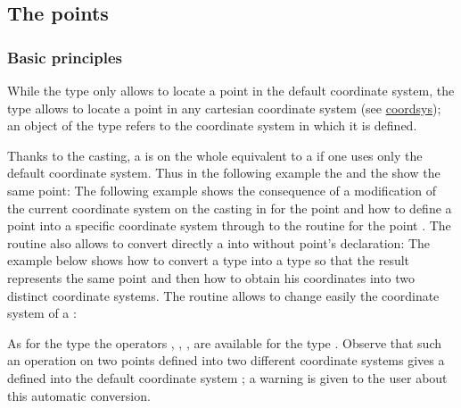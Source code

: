 \documentclass[pdftex]{article}
\begin{document}
\subsection{The points}
\subsubsection{Basic principles}

While the type  only allows to locate a point in the
default coordinate system, the type  allows to locate a point in any
cartesian coordinate system (see \href{#section.coordsys}{coordsys}); an object
of the type  refers to the coordinate system in which it is defined.

Thanks to the casting, a  is on the whole
 equivalent to a  if one uses only the default coordinate system. Thus
 in the following example the  and the 
 show the same point:
The following example shows the consequence of
a modification of the current coordinate system on the casting   in
 for the point  and how to define a point into a
specific coordinate system through to the routine 
 for the point .
The routine  also allows to
convert directly a  into  without point's declaration:
The example below shows how to convert a type  into a type
 so that the result represents the same point and then how
to obtain his coordinates into  two distinct coordinate systems.
The routine
allows to change easily the coordinate system of a :

As for the type  the operators \code{+}, \code{-},
\code{*}, \code{/} are available for the type . Observe
that such an operation on two points defined into two
different coordinate systems gives a  defined into the default coordinate system
; a warning is given to the user about this
automatic conversion.
\end{document}
